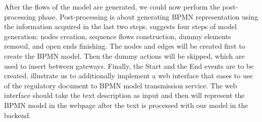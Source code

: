 After the flows of the model are generated, we could now perform the post-processing phase. Post-processing is about generating BPMN representation using the information acquired in the last two steps. \cite{t2m_1} suggests four steps of model generation: nodes creation, sequence flows construction, dummy elements removal, and open ends finishing. The nodes and edges will be created first to create the BPMN model. Then the dummy actions will be skipped, which are used to insert between gateways. Finally, the Start and the End events are to be created. \cite{complement_1} illustrate us to additionally implement a web interface that eases to use of the regulatory document to BPMN model transmission service. The web interface should take the text description as input and then will represent the BPMN model in the webpage after the text is processed with our model in the backend.